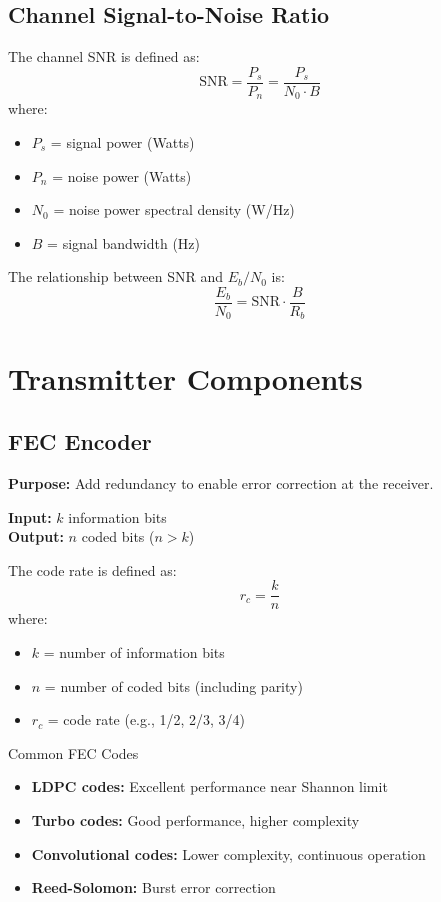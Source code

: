 \subsection{Channel Signal-to-Noise Ratio}

The channel SNR is defined as:
\begin{equation}
\mathrm{SNR} = \frac{P_s}{P_n} = \frac{P_s}{N_0 \cdot B}
\end{equation}
where:
\begin{itemize}
\item $P_s$ = signal power (Watts)
\item $P_n$ = noise power (Watts)
\item $N_0$ = noise power spectral density (W/Hz)
\item $B$ = signal bandwidth (Hz)
\end{itemize}

The relationship between SNR and $E_b/N_0$ is:
\begin{equation}
\frac{E_b}{N_0} = \mathrm{SNR} \cdot \frac{B}{R_b}
\end{equation}

\section{Transmitter Components}

\subsection{FEC Encoder}

\textbf{Purpose:} Add redundancy to enable error correction at the receiver.

\textbf{Input:} $k$ information bits\\
\textbf{Output:} $n$ coded bits ($n > k$)

The code rate is defined as:
\begin{equation}
r_c = \frac{k}{n}
\end{equation}
where:
\begin{itemize}
\item $k$ = number of information bits
\item $n$ = number of coded bits (including parity)
\item $r_c$ = code rate (e.g., 1/2, 2/3, 3/4)
\end{itemize}

\begin{calloutbox}{Common FEC Codes}
\begin{itemize}
\item \textbf{LDPC codes:} Excellent performance near Shannon limit
\item \textbf{Turbo codes:} Good performance, higher complexity
\item \textbf{Convolutional codes:} Lower complexity, continuous operation
\item \textbf{Reed-Solomon:} Burst error correction
\end{itemize}
\end{calloutbox}

